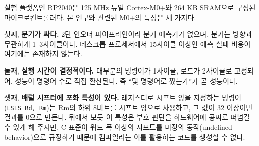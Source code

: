 실험 플랫폼인 RP2040은 125 MHz 듀얼 Cortex-M0+와 264 KB SRAM으로 구성된
마이크로컨트롤러다\cite{rp2040}. 본 연구와 관련된 M0+의 특성은 세 가지다.

첫째, \textbf{분기가 싸다.} 2단 인오더 파이프라인이라 분기 예측기가 없으며, 분기는 방향과
무관하게 1--3사이클이다. 데스크톱 프로세서에서 15사이클 이상인 예측 실패 비용이 여기에는
존재하지 않는다.

둘째, \textbf{실행 시간이 결정적이다.} 대부분의 명령어가 1사이클, 로드가 2사이클로
고정되어\cite{m0plus}, 성능이 명령어 수로 직접 환산된다. 즉 ``몇 명령어로 짰는가''가 곧
성능이다.

셋째, \textbf{배럴 시프터에 포화 특성이 있다.} 레지스터로 시프트 양을 지정하는 명령어
(\texttt{LSLS Rd, Rm})는 Rm의 하위 8비트를 시프트 양으로 사용하고, 그 값이 32 이상이면
결과를 0으로 만든다\cite{armv6m}. 뒤에서 보듯 이 특성은 부호 판단을 하드웨어에 공짜로
떠넘길 수 있게 해 주지만, C 표준이 워드 폭 이상의 시프트를 미정의 동작(undefined
behavior)으로 규정하기 때문에 컴파일러는 이를 활용하는 코드를 생성할 수 없다.
